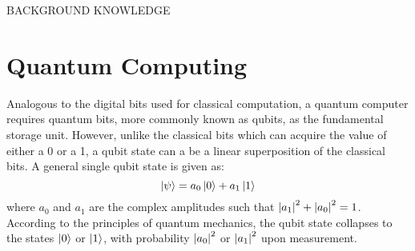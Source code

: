\documentclass[12]{article}
\begin{document}
\begin{center}
\begin{Huge}
BACKGROUND KNOWLEDGE
\end{Huge}
\end{center}
\section{Quantum Computing}
Analogous to the digital bits used for classical computation, a quantum computer requires quantum bits, more commonly known as qubits, as the fundamental storage unit. However, unlike the classical bits which can acquire the value of either a 0 or a 1, a qubit state can a be a linear superposition of the classical bits. A general single qubit state is given as:
\begin{equation}
\ket{\psi}= a_0 \ket{0} + a_1 \ket{1}  \label{eq:b1}
\end{equation}
where $a_0$ and $a_1$ are the complex amplitudes such that ${\abs{a_1}}^2 +{\abs{a_0}}^2 =1$. According to the principles of quantum mechanics, the qubit state collapses to the states $\ket{0}$ or $\ket{1}$, with probability ${\abs{a_0}}^2$ or ${\abs{a_1}}^2$ upon  measurement. 
\end{document}
